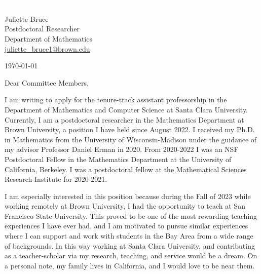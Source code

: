 \documentclass[11pt]{article}
\begin{document}
\section*{}

\noindent
\begin{minipage}{0.99\textwidth}
\begin{minipage}{0.69\textwidth}
\textcolor{white}{.}
\end{minipage}
\begin{minipage}{0.29\textwidth}
{
Juliette Bruce \\
Postdoctoral Researcher \\
Department of Mathematics \\
\href{mailto:juliette\_bruce1@brown.edu}{juliette\_bruce1@brown.edu}
}

\vspace{12pt}
\today
\end{minipage}
\end{minipage}


\vspace{12pt}
\noindent
Dear Committee Members,

I am writing to apply for the tenure-track assistant professorship in the Department of Mathematics and Computer Science at Santa Clara University. Currently, I am a postdoctoral researcher in the Mathematics Department at Brown University, a position I have held since August 2022. I received my Ph.D. in Mathematics from the University of Wisconsin-Madison under the guidance of my advisor Professor Daniel Erman in 2020. From 2020-2022 I was an NSF Postdoctoral Fellow in the Mathematics Department at the University of California, Berkeley. I was a postdoctoral fellow at the Mathematical Sciences Research Institute for 2020-2021.

I am especially interested in this position because during the Fall of 2023 while working remotely at Brown University, I had the opportunity to teach at San Francisco State University. This proved to be one of the most rewarding teaching experiences I have ever had, and I am motivated to pursue similar experiences where I can support and work with students in the Bay Area from a wide range of backgrounds. In this way working at Santa Clara University, and contributing as a teacher-scholar via my research, teaching, and service would be a dream. On a personal note, my family lives in California, and I would love to be near them. 
\end{document}
